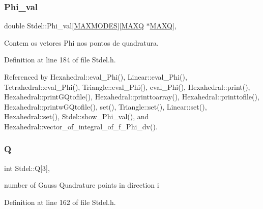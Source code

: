 \mbox{\label{classStdel_ab7849f154bd766857aac9557c19f7f84}} 
\subsubsection{\texorpdfstring{Phi\+\_\+val}{Phi\_val}}
{\footnotesize\ttfamily double Stdel\+::\+Phi\+\_\+val\mbox{[}\hyperlink{MyOptions_8h_aa75ccd382acf88cec3e9c8025c1f88b7}{M\+A\+X\+M\+O\+D\+ES}\mbox{]}\mbox{[}\hyperlink{MyOptions_8h_af708e94d886ba3f59582612949cac702}{M\+A\+XQ} $\ast$\hyperlink{MyOptions_8h_af708e94d886ba3f59582612949cac702}{M\+A\+XQ}\mbox{]}\hspace{0.3cm}{\ttfamily [protected]}, {\ttfamily [inherited]}}



Contem os vetores Phi nos pontos de quadratura. 



Definition at line 184 of file Stdel.\+h.



Referenced by Hexahedral\+::eval\+\_\+\+Phi(), Linear\+::eval\+\_\+\+Phi(), Tetrahedral\+::eval\+\_\+\+Phi(), Triangle\+::eval\+\_\+\+Phi(), eval\+\_\+\+Phi(), Hexahedral\+::print(), Hexahedral\+::print\+G\+Qtofile(), Hexahedral\+::printtoarray(), Hexahedral\+::printtofile(), Hexahedral\+::printw\+G\+Qtofile(), set(), Triangle\+::set(), Linear\+::set(), Hexahedral\+::set(), Stdel\+::show\+\_\+\+Phi\+\_\+val(), and Hexahedral\+::vector\+\_\+of\+\_\+integral\+\_\+of\+\_\+f\+\_\+\+Phi\+\_\+dv().

\mbox{\label{classStdel_a82074e598ad5af5ec45a3257a3c2b684}} 
\subsubsection{\texorpdfstring{Q}{Q}}
{\footnotesize\ttfamily int Stdel\+::Q\mbox{[}3\mbox{]}\hspace{0.3cm}{\ttfamily [protected]}, {\ttfamily [inherited]}}



number of Gauss Quadrature points in direction i 



Definition at line 162 of file Stdel.\+h.



